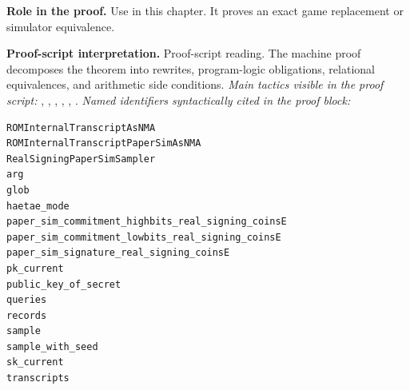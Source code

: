\begin{formaltheorem}
\noindent\textbf{Role in the proof.}
Use in this chapter. It proves an exact game replacement or simulator equivalence.

\noindent\textbf{Proof-script interpretation.}
Proof-script reading. The machine proof decomposes the theorem into rewrites, program-logic obligations, relational equivalences, and arithmetic side conditions.
\emph{Main tactics visible in the proof script:} , , , , , .
\emph{Named identifiers syntactically cited in the proof block:}
\begin{lstlisting}[language=EasyCrypt,basicstyle=\ttfamily\scriptsize]
ROMInternalTranscriptAsNMA
ROMInternalTranscriptPaperSimAsNMA
RealSigningPaperSimSampler
arg
glob
haetae_mode
paper_sim_commitment_highbits_real_signing_coinsE
paper_sim_commitment_lowbits_real_signing_coinsE
paper_sim_signature_real_signing_coinsE
pk_current
public_key_of_secret
queries
records
sample
sample_with_seed
sk_current
transcripts
\end{lstlisting}

\end{formaltheorem}

